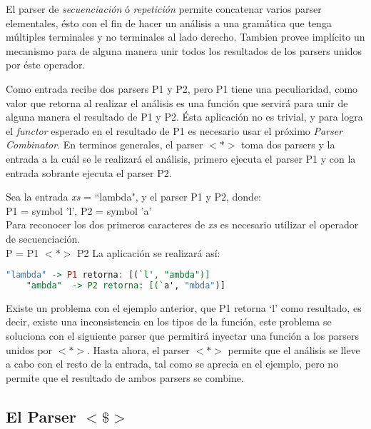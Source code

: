 El parser de \emph{secuenciación} ó \emph{repetición} permite concatenar varios parser elementales, ésto con el fin de hacer un análisis a una gramática que tenga múltiples terminales y no terminales al lado derecho. Tambien provee implícito un mecanismo para de alguna manera unir todos los resultados de los parsers unidos por éste operador.

Como entrada recibe dos parsers \textsc{P1} y \textsc{P2}, pero \textsc{P1} tiene una peculiaridad, como valor que retorna al realizar el análisis es una función que servirá para unir de alguna manera el resultado de \textsc{P1} y \textsc{P2}. Ésta aplicación no es trivial, y para logra el \emph{functor} esperado en el resultado de \textsc{P1} es necesario usar el próximo \emph{Parser Combinator}.
En terminos generales, el parser $<*>$ toma dos parsers y la entrada a la cuál se le realizará el análisis, primero ejecuta el parser \textsc{P1} y con la entrada sobrante ejecuta el parser \textsc{P2}.

\begin{exmp}
	Sea la entrada \emph{xs} = ``lambda", y el parser \textsc{P1} y \textsc{P2}, donde:\\	\textsc{P1} = symbol 'l',
	\textsc{P2} = symbol 'a'\\
	Para reconocer los dos primeros caracteres de \emph{xs} es necesario utilizar el operador de secuenciación.\\
	\textsc{P} = \textsc{P1} $<*>$ \textsc{P2}
	La aplicación se realizará así:
	
	\begin{lstlisting}[language=Haskell]
	"lambda" -> P1 retorna: [(`l', "ambda")]
	"ambda"  -> P2 retorna: [(`a', "mbda")]
	\end{lstlisting}
\end{exmp}

Existe un problema con el ejemplo anterior, que \textsc{P1} retorna `l' como resultado, es decir, existe una inconsistencia en los tipos de la función, este problema se soluciona con el siguiente parser que permitirá inyectar una función a los parsers unidos por $<*>$. Hasta ahora, el parser $<*>$ permite que el análisis se lleve a cabo con el resto de la entrada, tal como se aprecia en el ejemplo, pero no permite que el resultado de ambos parsers se combine.


\subsection{El Parser $<\$>$}


